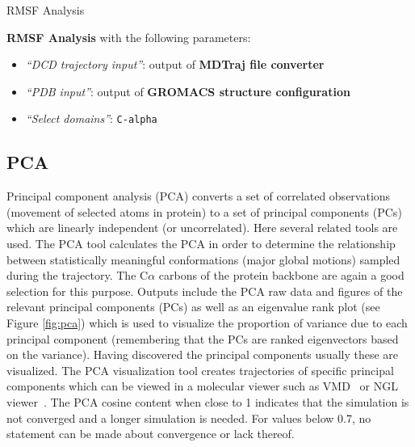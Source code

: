\documentclass[twocolumn]{bmcart}%
\providecommand{\tightlist}{%
  \setlength{\itemsep}{0pt}\setlength{\parskip}{0pt}}
\begin{document}
\begin{handson_box_colour}{RMSF Analysis}



  \textbf{RMSF Analysis} with the following parameters:

  \begin{itemize}
  \tightlist
  \item
    \emph{``DCD trajectory input''}: output of
    \textbf{MDTraj file converter}
  \item
    \emph{``PDB input''}:
    output of \textbf{GROMACS
    structure configuration}
  \item
    \emph{``Select domains''}: \texttt{C-alpha}
  \end{itemize}



\end{handson_box_colour}


\hypertarget{pca-analysis}{%
\subsection*{PCA}\label{pca-analysis}}

Principal component analysis (PCA) converts a set of correlated
observations (movement of selected atoms in protein) to a set of principal
components (PCs) which are linearly independent (or uncorrelated). Here several related tools are used. 
The PCA tool calculates the PCA in order to determine the relationship between statistically meaningful conformations (major global motions) sampled during the trajectory. The C$\alpha$ carbons of the protein backbone are again a good selection for this purpose.  Outputs include the PCA raw data and figures of the relevant principal components (PCs) as well as an eigenvalue rank plot (see Figure \ref{fig:pca}) which is used to visualize the proportion of variance due to each principal component (remembering that the PCs are ranked eigenvectors based on the variance). 
Having discovered the principal components usually these are visualized. The PCA visualization tool creates trajectories of specific principal components which can be viewed in a molecular viewer such as VMD~\cite{hump_vmd_1996} or NGL viewer~\cite{Rose2018ngl}. The PCA cosine content when close to 1 indicates that the simulation is not converged and a longer simulation is needed. For values below 0.7, no statement can be made about convergence or lack thereof. 
\end{document}
